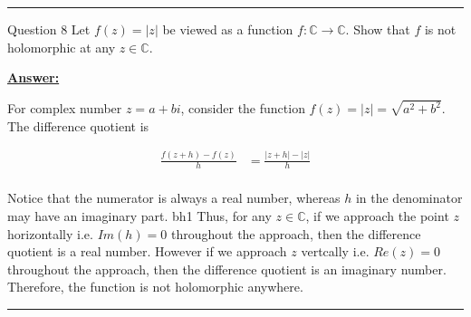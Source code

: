 \documentclass{article}
\newcommand{\C}{\mathbb{C}}
\begin{document}
\vskip 0.5cm
\hrule 
\vskip 0.5cm

\begin{mathdefinitionbox}{Question 8}
\vskip 0.5cm
Let $f(z) = |z|$ be viewed as a function $f : \C \rightarrow \C$. Show that $f$ is not holomorphic at any $z \in \C$.
\end{mathdefinitionbox}
  
\vskip 0.5cm
\underline{\textbf{Answer:}} 

\vskip 0.5cm
For complex number $z = a + bi$, consider the function $f(z) = |z| = \sqrt{a^2 + b^2}$. The difference quotient is 

\begin{align*}
  \frac{f(z + h) - f(z)}{h} &= \frac{|z+h| - |z|}{h} \\
\end{align*}

Notice that the numerator is always a real number, whereas $h$ in the denominator may have an imaginary part. 
bh1
\vskip 0.5cm
Thus, for any $z \in \C$, if we approach the point $z$ horizontally i.e. $Im(h) = 0$ throughout the approach, then the difference quotient is a real number. However if we approach $z$ vertcally i.e. $Re(z) = 0$ throughout the approach, then the difference quotient is an imaginary number. Therefore, the function is not holomorphic anywhere.

\vskip 0.5cm
\hrule 
\vskip 0.5cm

\end{document}
